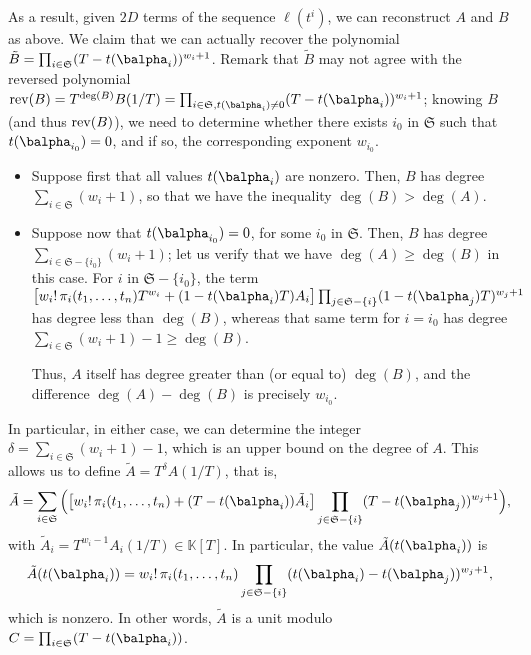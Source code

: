 \documentclass[12pt]{article}
\def\K {\ensuremath{\mathbb{K}}}
\begin{document}
As a result, given $2D$ terms of the sequence $\ell(t^i)$, we can
reconstruct $A$ and $B$ as above. We claim that we can actually
recover the polynomial $\tilde B = \prod_{i \in
  \mathfrak{S}}(T-t(\balpha_i) )^{w_{i}+1}$.  Remark that $\tilde B$
may not agree with the reversed polynomial ${\rm rev}(B)=T^{\deg(B)}
B(1/T) = \prod_{i \in \mathfrak{S}, t(\balpha_i)\ne 0}(T-t(\balpha_i)
)^{w_{i}+1}$; knowing $B$ (and thus ${\rm rev}(B)$), we need to
determine whether there exists $i_0$ in $\mathfrak{S}$ such that
$t(\balpha_{i_0})=0$, and if so, the corresponding exponent $w_{i_0}$.
\begin{itemize}
\item Suppose first that all values $t(\balpha_i)$ are nonzero.  Then,
  $B$ has degree $\sum_{i \in \mathfrak{S}} (w_i+1)$, so that we have
  the inequality $\deg(B) > \deg(A)$.
\item Suppose now that $t(\balpha_{i_0})=0$, for some $i_0$ in
  $\mathfrak{S}$. Then, $B$ has degree $\sum_{i \in
  \mathfrak{S}-\{i_0\}} (w_i+1)$; let us verify that we have $\deg(A)
  \ge \deg(B)$ in this case.  For $i$ in $ \mathfrak{S}-\{i_0\}$, the
  term $\big[ w_i!\, \pi_{i}(t_1,\dots,t_n) T^{w_i} +
    (1-t(\balpha_i) T)A_i\big] \prod_{j \in
    \mathfrak{S}-\{i\}}(1-t(\balpha_j) T)^{w_{j}+1}$ has degree less
  than $\deg(B)$, whereas that same term for $i=i_0$ has degree
  $\sum_{i \in \mathfrak{S}} (w_i+1)-1 \ge \deg(B)$.

  Thus, $A$ itself has degree greater than (or equal to) $\deg(B)$,
  and the difference $\deg(A)-\deg(B)$ is precisely $w_{i_0}$.
\end{itemize}
In particular, in either case, we can determine the integer $\delta=\sum_{i \in \mathfrak{S}} (w_i+1)-1$,
which is an upper bound on the degree of $A$.
This allows us to define $\tilde A = T^{\delta}A(1/T)$, that is,
$$\tilde A = 
\sum_{i \in \mathfrak{S}} \Big(\big[
 w_i!\, \pi_{i}(t_1,\dots,t_n) + (T-t(\balpha_i)  )\tilde A_i\big]
\prod_{j \in \mathfrak{S}-\{i\}}(T-t(\balpha_j) )^{w_{j}+1}\Big),$$
with $\tilde A_i = T^{w_i-1} A_i(1/T) \in \K[T]$. In particular, 
the value $\tilde A(t(\balpha_i))$ is 
$$\tilde A(t(\balpha_i))= w_i!\, \pi_{i}(t_1,\dots,t_n)\prod_{j \in
  \mathfrak{S}-\{i\}}(t(\balpha_i)-t(\balpha_j) )^{w_{j}+1},$$ which is
nonzero. In other words, $\tilde A$ is a unit modulo $C= \prod_{i \in
  \mathfrak{S}}(T-t(\balpha_i) )$.
\end{document}
